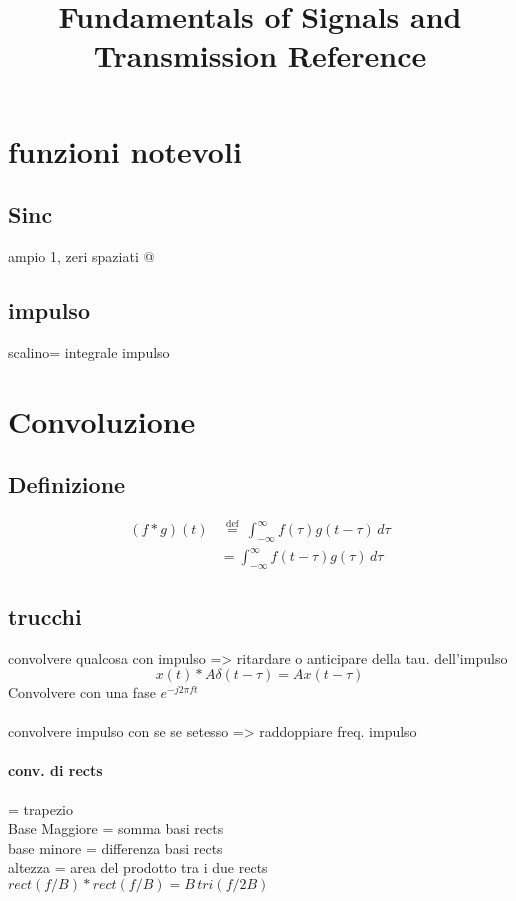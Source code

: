 \documentclass[12pt,a4paper,]{article}
\title{Fundamentals of Signals and Transmission Reference}
\date{}
\author{}
\begin{document}
\maketitle
\section{funzioni notevoli}
\subsection{Sinc}
ampio 1, zeri spaziati @ 
\subsection{impulso}
scalino= integrale impulso
\section{Convoluzione}
\subsection{Definizione}

\begin{align}
(f * g )(t) & \, \stackrel{\mathrm{def}}{=}\ \int_{-\infty}^\infty f(\tau) g(t - \tau) \, d\tau \\
& = \int_{-\infty}^\infty f(t-\tau) g(\tau)\, d\tau
\end{align}
\subsection{trucchi}
convolvere qualcosa con impulso => ritardare o anticipare della tau. dell'impulso\\
\begin{equation}
x(t) \ast A \delta(t-\tau) = Ax(t-\tau)
\end{equation}
Convolvere con una fase $e^{-j2\pi f t}$\\\\
convolvere impulso con se se setesso => raddoppiare freq. impulso \\
\paragraph{conv. di rects} = trapezio\\
Base Maggiore = somma basi rects\\
base minore = differenza basi rects\\
altezza = area del prodotto tra i due rects\\
$rect(f/B) * rect (f/B) = B\, tri(f/2B)$
\end{document}
